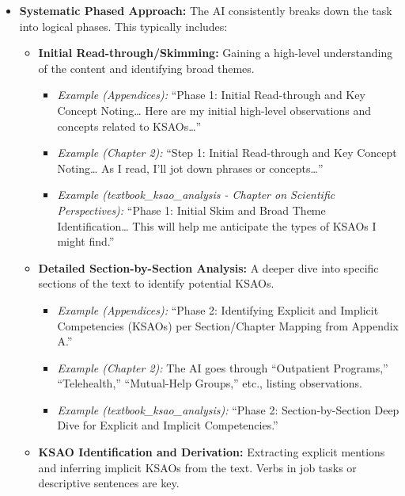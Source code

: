 \documentclass[
  letterpaper,
  DIV=11,
  numbers=noendperiod]{scrartcl}
\providecommand{\tightlist}{%
  \setlength{\itemsep}{0pt}\setlength{\parskip}{0pt}}
\begin{document}
\begin{itemize}
\item
  \textbf{Systematic Phased Approach:} The AI consistently breaks down
  the task into logical phases. This typically includes:

  \begin{itemize}
  \tightlist
  \item
    \textbf{Initial Read-through/Skimming:} Gaining a high-level
    understanding of the content and identifying broad themes.

    \begin{itemize}
    \tightlist
    \item
      \emph{Example (Appendices):} ``Phase 1: Initial Read-through and
      Key Concept Noting\ldots{} Here are my initial high-level
      observations and concepts related to KSAOs\ldots{}''
    \item
      \emph{Example (Chapter 2):} ``Step 1: Initial Read-through and Key
      Concept Noting\ldots{} As I read, I'll jot down phrases or
      concepts\ldots{}''
    \item
      \emph{Example (textbook\_ksao\_analysis - Chapter on Scientific
      Perspectives):} ``Phase 1: Initial Skim and Broad Theme
      Identification\ldots{} This will help me anticipate the types of
      KSAOs I might find.''
    \end{itemize}
  \item
    \textbf{Detailed Section-by-Section Analysis:} A deeper dive into
    specific sections of the text to identify potential KSAOs.

    \begin{itemize}
    \tightlist
    \item
      \emph{Example (Appendices):} ``Phase 2: Identifying Explicit and
      Implicit Competencies (KSAOs) per Section/Chapter Mapping from
      Appendix A.''
    \item
      \emph{Example (Chapter 2):} The AI goes through ``Outpatient
      Programs,'' ``Telehealth,'' ``Mutual-Help Groups,'' etc., listing
      observations.
    \item
      \emph{Example (textbook\_ksao\_analysis):} ``Phase 2:
      Section-by-Section Deep Dive for Explicit and Implicit
      Competencies.''
    \end{itemize}
  \item
    \textbf{KSAO Identification and Derivation:} Extracting explicit
    mentions and inferring implicit KSAOs from the text. Verbs in job
    tasks or descriptive sentences are key.


\end{itemize}
\end{itemize}
\end{document}
